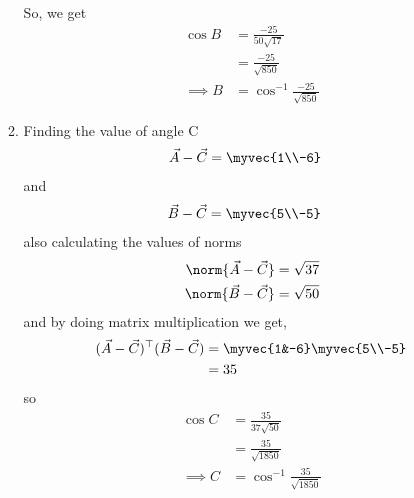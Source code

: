 \documentclass[11pt]{book}
\begin{document}
\begin{enumerate}[label=\thesection.\arabic*.,ref=\thesection.\theenumi]
\begin{enumerate}
\begin{align}
\end{align}
So, we get 
\begin{align}
	\cos{B} &= \frac{-25}{{50} \sqrt{17}}\\
 &= \frac{-25}{\sqrt{850}}\\
 \implies B& = \cos^{-1}{\frac{-25}{\sqrt{850}}}
\end{align}
\item Finding the value of angle C
\begin{align}
 \vec{A}-\vec{C} &=\myvec{1\\-6}
\end{align}
and 
\begin{align}
 \vec{B}-\vec{C} &= \myvec{5\\-5}
\end{align}
also calculating the values of norms
\begin{align}
 \norm{\vec{A}-\vec{C}} &= \sqrt{37}\\
	\norm{\vec{B}-\vec{C}} &= \sqrt{50}
\end{align}
and by doing matrix multiplication we get,
\begin{align}
\begin{split}
 (\vec{A}-\vec{C})^{\top}(\vec{B}-\vec{C}) &= \myvec{1&-6}\myvec{5\\-5}\\
 &= 35
\end{split}
\end{align}
so 
\begin{align}
	\cos{C} &= \frac{35}{{37} \sqrt{50}}\\
 &= \frac{35}{\sqrt{1850}}\\
 \implies C &= \cos^{-1}{\frac{35}{\sqrt{1850}}}
\end{align}
\end{enumerate}
\latexprintindex
\end{enumerate}
\end{document}
